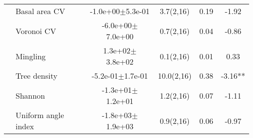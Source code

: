 \begin{longtable}{llcccS[table-format=-2.2, table-space-text-post = {***}]}
   \midrule
{} & Basal area CV & -1.0e+00$\pm$5.3e-01 & 3.7(2,16) & 0.19 & -1.92 \\ 
   & Voronoi CV & -6.0e+00$\pm$7.0e+00 & 0.7(2,16) & 0.04 & -0.86 \\ 
   & Mingling &  1.3e+02$\pm$3.8e+02 & 0.1(2,16) & 0.01 & 0.33 \\ 
   & Tree density & -5.2e-01$\pm$1.7e-01 & 10.0(2,16) & 0.38 & -3.16** \\ 
   & Shannon & -1.3e+01$\pm$1.2e+01 & 1.2(2,16) & 0.07 & -1.11 \\ 
   & Uniform angle index & -1.8e+03$\pm$1.9e+03 & 0.9(2,16) & 0.06 & -0.97 \\ 
   \bottomrule
\end{longtable}

